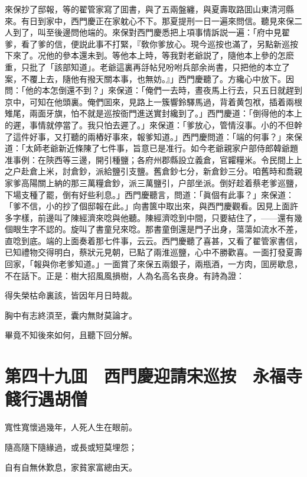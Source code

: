 來保抄了邸報，等的翟管家寫了囬書，與了五兩盤纏，與夏壽取路囬山東清河縣來。有日到家中，西門慶正在家躭心不下。那夏提刑一日一遍來問信。聽見來保二人到了，叫至後邊問他端的。來保對西門慶悉把上項事情訴説一遍：「府中見翟爹，看了爹的信，便説此事不打緊，『敎你爹放心。現今巡按也滿了，另點新巡按下來了。况他的參本還未到。等他本上時，等我對老爺説了，隨他本上參的怎麽重，只批了「該部知道」。老爺這裏再㧱帖兒吩咐兵部余尚書，只把他的本立了案，不覆上去，隨他有撥天關本事，也無妨。』」西門慶聽了。方纔心中放下。因問：「他的本怎倒還不到？」來保道：「俺們一去時，晝夜馬上行去，只五日就趕到京中，可知在他頭裏。俺們囬來，見路上一簇響鈴驛馬過，背着黄包袱，插着兩根雉尾，兩面牙旗，怕不就是巡按衙門進送實封纔到了。」西門慶道：「倒得他的本上的遲，事情就停當了。我只怕去遲了。」來保道：「爹放心，管情沒事。小的不但幹了這件好事，又打聽的兩樁好事來，報爹知道。」西門慶問道：「端的何事？」來保道：「太師老爺新近條陳了七件事，旨意已是准行。如今老爺親家户部侍郎韓爺題准事例：在陝西等三邊，開引種鹽；各府州郡縣設立義倉，官糶糧米。令民間上上之户赴倉上米，討倉鈔，派給鹽引支鹽。舊倉鈔七分，新倉鈔三分。咱舊時和喬親家爹高陽關上納的那三萬糧倉鈔，派三萬鹽引，户部坐派。倒好趁着蔡老爹巡鹽，下場支種了罷，倒有好些利息。」西門慶聽言，問道：「眞個有此事？」來保道：「爹不信，小的抄了個邸報在此。」向書篋中取出來，與西門慶觀看。因見上面許多字樣，前邊叫了陳經濟來唸與他聽。陳經濟唸到中間，只要結住了，——還有幾個眼生字不認的。旋叫了書童兒來唸。那書童倒還是門子出身，蕩蕩如流水不差，直唸到底。端的上面奏着那七件事，云云。西門慶聽了喜甚，又看了翟管家書信，已知禮物交得明白，蔡狀元見朝，已點了兩淮巡鹽，心中不勝歡喜。一面打發夏壽回家，「報與你老爹知道。」一面賞了來保五兩銀子，兩瓶酒，一方肉，囬房歇息，不在話下。正是：樹大招風風損樹，人為名高名丧身。有詩為證：

得失榮枯命裏該，皆因年月日時裁。

胸中有志終湏至，囊内無財莫論才。

畢竟不知後來如何，且聽下回分解。

\chapter*{第四十九囬　西門慶迎請宋巡按　永福寺餞行遇胡僧}

寬性寬懷過幾年，人死人生在眼前。

隨高隨下隨緣過，或長或短莫埋怨；

自有自無休歎息，家貧家富總由天。

